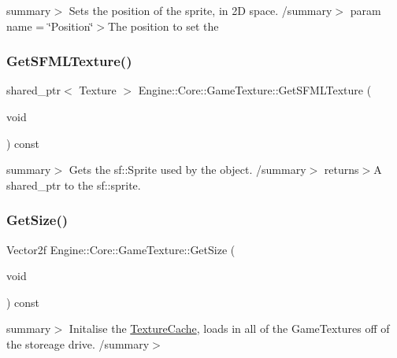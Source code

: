 summary$>$ Sets the position of the sprite, in 2D space. /summary$>$ param name = \char`\"{}\+Position\char`\"{}$>$The position to set the \mbox{\label{class_engine_1_1_core_1_1_game_texture_a18a4679d1538d7390b613d16f3b4bd5a}} 
\subsubsection{\texorpdfstring{Get\+S\+F\+M\+L\+Texture()}{GetSFMLTexture()}}
{\footnotesize\ttfamily shared\+\_\+ptr$<$ Texture $>$ Engine\+::\+Core\+::\+Game\+Texture\+::\+Get\+S\+F\+M\+L\+Texture (\begin{DoxyParamCaption}\item[{void}]{ }\end{DoxyParamCaption}) const}

summary$>$ Gets the sf\+::\+Sprite used by the object. /summary$>$ returns$>$A shared\+\_\+ptr to the sf\+::sprite.\mbox{\label{class_engine_1_1_core_1_1_game_texture_a7ce550b437a2b17b8cf574c6a91b6f60}} 
\subsubsection{\texorpdfstring{Get\+Size()}{GetSize()}}
{\footnotesize\ttfamily Vector2f Engine\+::\+Core\+::\+Game\+Texture\+::\+Get\+Size (\begin{DoxyParamCaption}\item[{void}]{ }\end{DoxyParamCaption}) const}

summary$>$ Initalise the \hyperlink{class_engine_1_1_core_1_1_texture_cache}{Texture\+Cache}, loads in all of the Game\+Textures off of the storeage drive. /summary$>$ \mbox{\label{class_engine_1_1_core_1_1_game_texture_af0169ac026c5b15cb3195d1199b13d33}} 
